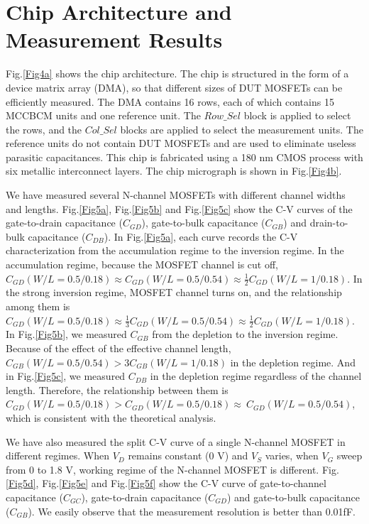 \documentclass[journal]{IEEEtran}
\begin{document}
\section{Chip Architecture and Measurement Results}
 
Fig.\ref{Fig4a} shows the chip architecture. The chip is structured in the form of a device matrix array (DMA), so that different sizes of DUT MOSFETs can be efficiently measured. The DMA contains 16 rows, each of which contains 15 MCCBCM units and one reference unit. The $Row\_Sel$ block is applied to select the rows, and the $Col\_Sel$ blocks are applied to select the measurement units. The reference units do not contain DUT MOSFETs and are used to eliminate useless parasitic capacitances. This chip is fabricated using a 180 nm CMOS process with six metallic interconnect layers. The chip micrograph is shown in Fig.\ref{Fig4b}.

We have measured several N-channel MOSFETs with different channel widths and lengths. Fig.\ref{Fig5a}, Fig.\ref{Fig5b} and Fig.\ref{Fig5c} show the C-V curves of the gate-to-drain capacitance ($C_{GD}$), gate-to-bulk capacitance ($C_{GB}$) and drain-to-bulk capacitance ($C_{DB}$). In Fig.\ref{Fig5a}, each curve records the C-V characterization from the accumulation regime to the inversion regime. In the accumulation regime, because the MOSFET channel is cut off, $C_{GD}(W/L=0.5/0.18) \approx C_{GD}(W/L=0.5/0.54) \approx \frac{1}{2} C_{GD}(W/L=1/0.18)$. In the strong inversion regime, MOSFET channel turns on, and the relationship among them is $C_{GD}(W/L=0.5/0.18) \approx \frac{1}{3} C_{GD}(W/L=0.5/0.54) \approx \frac{1}{2} C_{GD}(W/L=1/0.18)$. In Fig.\ref{Fig5b}, we measured $C_{GB}$ from the depletion to the inversion regime. Because of the effect of the effective channel length, $C_{GB}(W/L=0.5/0.54)>3C_{GB}(W/L=1/0.18)$ in the depletion regime. And in Fig.\ref{Fig5c}, we measured $C_{DB}$ in the depletion regime regardless of the channel length. Therefore, the relationship between them is $C_{GD}(W/L=0.5/0.18)>C_{GD}(W/L=0.5/0.18) \approx \ C_{GD}(W/L=0.5/0.54)$, which is consistent with the theoretical analysis. 

We have also measured the split C-V curve of a single N-channel MOSFET in different regimes. When $V_{D}$ remains constant (0 V) and $V_{S}$ varies, when $V_{G}$ sweep from 0 to 1.8 V, working regime of the N-channel MOSFET is different. Fig.\ref{Fig5d}, Fig.\ref{Fig5e} and Fig.\ref{Fig5f} show the C-V curve of gate-to-channel capacitance ($C_{GC}$), gate-to-drain capacitance ($C_{GD}$) and gate-to-bulk capacitance ($C_{GB}$). We easily observe that the measurement resolution is better than 0.01fF. 
\end{document}
